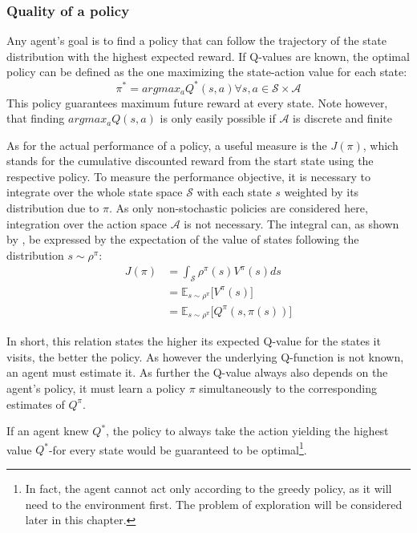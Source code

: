 \subsubsection{Quality of a policy}

Any agent's goal is to find a policy that can follow the trajectory of the state distribution with the highest expected reward. If Q-values are known, the optimal policy can be defined as the one maximizing the state-action value for each state:
\begin{equation}
	\pi^* = argmax_aQ^*(s,a) \forall s,a \in \mathcal{S} \times \mathcal{A}
\end{equation}
This policy guarantees maximum future reward at every state. Note however, that finding $argmax_aQ(s,a)$ is only easily possible if $\mathcal{A}$ is discrete and finite

As for the actual performance of a policy, a useful measure is the  $J(\pi)$, which stands for the cumulative discounted reward from the start state using the respective policy. To measure the performance objective, it is necessary to integrate over the whole state space $\mathcal{S}$ with each state $s$ weighted by its distribution due to $\pi$. As only non-stochastic policies are considered here, integration over the action space $\mathcal{A}$ is not necessary. The integral can, as shown by \cite{silver_deterministic_2014}, be expressed by the expectation of the value of states following the distribution $s\sim\rho^\pi$:
\begin{align}
	J(\pi) &= \int_\mathcal{S} \rho^\pi(s) V^\pi(s) ds \nonumber\\
	       &= \mathds{E}_{s\sim\rho^\pi} \big[V^\pi(s)] \nonumber\\
	       &= \mathds{E}_{s\sim\rho^\pi} \big[Q^\pi(s, \pi(s))] \label{eq:performance01}
\end{align}

In short, this relation states the higher its expected Q-value for the states it visits, the better the policy. As however the underlying Q-function is not known, an agent must estimate it. As further the Q-value always also depends on the agent's policy, it must learn a policy $\pi$ simultaneously to the corresponding estimates of $Q^\pi$. 

If an agent knew $Q^*$, the  policy to always take the action yielding the highest value $Q^*$-for every state would be guaranteed to be optimal\footnote{\label{footnote:explore} In fact, the agent cannot act only according to the greedy policy, as it will need to  the environment first. The problem of exploration will be considered later in this chapter.}.

